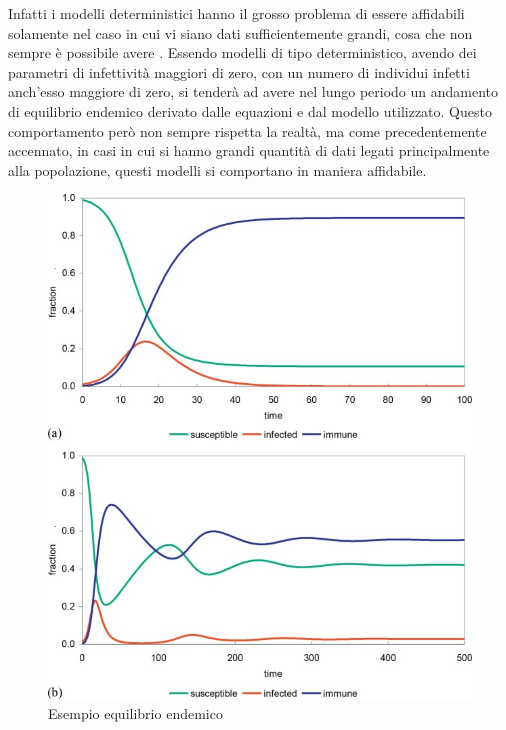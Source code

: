 Infatti i modelli deterministici hanno il grosso problema di
essere affidabili solamente nel caso in cui vi siano dati 
sufficientemente grandi, cosa che non sempre è possibile
avere \cite{wiki:Compartmental_models_in_epidemiology}.
Essendo modelli di tipo deterministico, avendo dei parametri 
di infettività maggiori di zero, con un numero di individui infetti
anch'esso maggiore di zero, si tenderà ad avere nel lungo
periodo un andamento di equilibrio endemico derivato 
dalle equazioni e dal modello utilizzato. Questo comportamento
però non sempre rispetta la realtà, ma come precedentemente 
accennato, in casi in cui si hanno grandi quantità di dati 
legati principalmente alla popolazione, questi modelli si 
comportano in maniera affidabile.

\begin{figure}[h]
    \begin{center}
        \includegraphics[scale=0.7]{img/3-s2.0-B9780128012383988378-f98837-02-9780128012383.jpg}
        \caption{Esempio equilibrio endemico}
        \label{fig:Endemic_equilibrium}
    \end{center}
\end{figure}

